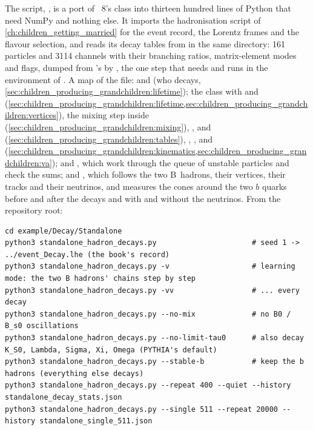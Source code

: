 The script, , is a port of
\PYTHIA~8's  class into thirteen hundred lines of Python that
need NumPy and nothing else. It imports the hadronisation script of
\cref{ch:children_getting_married} for the event record, the Lorentz frames
and the flavour selection, and reads its decay tables from
 in the same directory: 161 particles and 3114
channels with their branching ratios, matrix-element modes and
 flags, dumped from \PYTHIA's  by
, the one step that needs \PYTHIA and runs in
the environment of . A map of the file:
 and  (who decays,
\cref{sec:children_producing_grandchildren:lifetime}); the 
class with  and 
(\cref{sec:children_producing_grandchildren:lifetime,sec:children_producing_grandchildren:vertices}),
the mixing step inside  (\cref{sec:children_producing_grandchildren:mixing}),
,  and 
(\cref{sec:children_producing_grandchildren:tables}), ,
,  and 
(\cref{sec:children_producing_grandchildren:kinematics,sec:children_producing_grandchildren:va});
 and , which work through the queue of unstable
particles and check the sums; and , which follows the two
B~hadrons, their vertices, their tracks and their neutrinos, and measures
the cones around the two $b$ quarks before and after the decays and with
and without the neutrinos. From the repository root:
\begin{verbatim}
cd example/Decay/Standalone
python3 standalone_hadron_decays.py                      # seed 1 -> ../event_Decay.lhe (the book's record)
python3 standalone_hadron_decays.py -v                   # learning mode: the two B hadrons' chains step by step
python3 standalone_hadron_decays.py -vv                  # ... every decay
python3 standalone_hadron_decays.py --no-mix             # no B0 / B_s0 oscillations
python3 standalone_hadron_decays.py --no-limit-tau0      # also decay K_S0, Lambda, Sigma, Xi, Omega (PYTHIA's default)
python3 standalone_hadron_decays.py --stable-b           # keep the b hadrons (everything else decays)
python3 standalone_hadron_decays.py --repeat 400 --quiet --history standalone_decay_stats.json
python3 standalone_hadron_decays.py --single 511 --repeat 20000 --history standalone_single_511.json
\end{verbatim}
